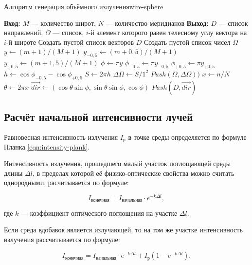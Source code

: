 \begin{Algorithm}{Алгоритм генерация объёмного излучения}{wire-sphere}
	\begin{algorithmic}[1]
		\State \textbf{Вход:} $M$ — количество широт, $N$ — количество меридианов
		\State \textbf{Выход:} $D$ — список направлений, $\Omega$ — список, $i$-й элемент которого равен телесному углу вектора на $i$-й широте
		\State Создать пустой список векторов $D$
		\State Создать пустой список чисел $\Omega$
			\State $y \gets (m + 1) / (M + 1)$
			\State $y_{-0,5} \gets (m + 0,5) / (M + 1)$
			\State $y_{+0,5} \gets (m + 1,5) / (M + 1)$
			\State $\phi \gets \pi y$
			\State $\phi_{-0,5} \gets \pi y_{-0,5}$
			\State $\phi_{+0,5} \gets \pi y_{+0,5}$
			\State $h \gets \cos{\phi_{-0,5}} - \cos{\phi_{+0,5}}$
			\State $S \gets 2\pi h$
			\State $\Delta\Omega \gets S / 1^2$
			\State $Push(\Omega, \Delta\Omega))$
				\State $x \gets n / N$
				\State $\theta \gets 2 \pi x$
				\State $\overrightarrow{dir} \gets (\cos\theta \sin\phi, \sin\theta \sin\phi, \cos\phi)$
				\State $Push(D, \overrightarrow{dir})$

			\EndFor
		\EndFor
	\end{algorithmic}
\end{Algorithm}

\subsection{Расчёт начальной интенсивности лучей}

Равновесная интенсивность излучения $I_{\text{р}}$ в точке среды определяется по формуле Планка \eqref{eqn:intensity-plank}.

Интенсивность излучения, прошедшего малый участок поглощающей среды длины $\Delta l$, в пределах которой её физико-оптические свойства можно считать однородными, расчитывается по формуле:

\begin{equation}
	I_{\text{конечная}} = I_{\text{начальная}} \cdot e^{-k\Delta l},
\end{equation}

\noindent где $k$ — коэффициент оптического поглощения на участке $\Delta l$.

Если среда вдобавок является излучающей, то на том же участке интенсивность излучения рассчитывается по формуле:

\begin{equation}
	I_{\text{конечная}} = I_{\text{начальная}} \cdot e^{-k\Delta l} + I_{\text{р}}\left(1 - e^{-k \Delta l} \right).
\end{equation}

